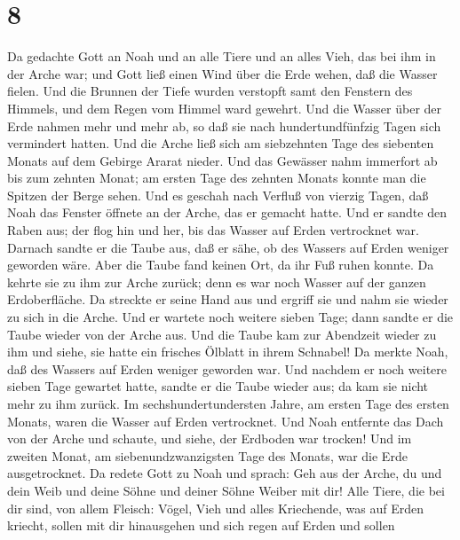 \hypertarget{section-7}{%
\section{8}\label{section-7}}

 Da gedachte Gott an Noah und an alle Tiere und an alles
Vieh, das bei ihm in der Arche war; und Gott ließ einen Wind über die
Erde wehen, daß die Wasser fielen.  Und die Brunnen der
Tiefe wurden verstopft samt den Fenstern des Himmels, und dem Regen vom
Himmel ward gewehrt.  Und die Wasser über der Erde nahmen
mehr und mehr ab, so daß sie nach hundertundfünfzig Tagen sich
vermindert hatten.  Und die Arche ließ sich am siebzehnten
Tage des siebenten Monats auf dem Gebirge Ararat nieder. 
Und das Gewässer nahm immerfort ab bis zum zehnten Monat; am ersten Tage
des zehnten Monats konnte man die Spitzen der Berge sehen.
 Und es geschah nach Verfluß von vierzig Tagen, daß Noah
das Fenster öffnete an der Arche, das er gemacht hatte. 
Und er sandte den Raben aus; der flog hin und her, bis das Wasser auf
Erden vertrocknet war.  Darnach sandte er die Taube aus,
daß er sähe, ob des Wassers auf Erden weniger geworden wäre.
 Aber die Taube fand keinen Ort, da ihr Fuß ruhen konnte.
Da kehrte sie zu ihm zur Arche zurück; denn es war noch Wasser auf der
ganzen Erdoberfläche. Da streckte er seine Hand aus und ergriff sie und
nahm sie wieder zu sich in die Arche.  Und er wartete
noch weitere sieben Tage; dann sandte er die Taube wieder von der Arche
aus.  Und die Taube kam zur Abendzeit wieder zu ihm und
siehe, sie hatte ein frisches Ölblatt in ihrem Schnabel! Da merkte Noah,
daß des Wassers auf Erden weniger geworden war.  Und
nachdem er noch weitere sieben Tage gewartet hatte, sandte er die Taube
wieder aus; da kam sie nicht mehr zu ihm zurück.  Im
sechshundertundersten Jahre, am ersten Tage des ersten Monats, waren die
Wasser auf Erden vertrocknet. Und Noah entfernte das Dach von der Arche
und schaute, und siehe, der Erdboden war trocken!  Und im
zweiten Monat, am siebenundzwanzigsten Tage des Monats, war die Erde
ausgetrocknet.  Da redete Gott zu Noah und sprach:
 Geh aus der Arche, du und dein Weib und deine Söhne und
deiner Söhne Weiber mit dir!  Alle Tiere, die bei dir
sind, von allem Fleisch: Vögel, Vieh und alles Kriechende, was auf Erden
kriecht, sollen mit dir hinausgehen und sich regen auf Erden und sollen
